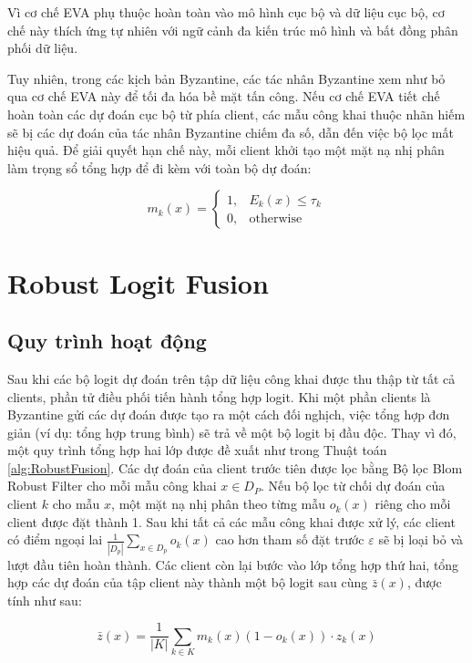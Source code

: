 Vì cơ chế EVA phụ thuộc hoàn toàn vào mô hình cục bộ và dữ liệu cục bộ, cơ chế này thích ứng tự nhiên với ngữ cảnh đa kiến trúc mô hình và bất đồng phân phối dữ liệu.

Tuy nhiên, trong các kịch bản Byzantine, các tác nhân Byzantine xem như bỏ qua cơ chế EVA này để tối đa hóa bề mặt tấn công. Nếu cơ chế EVA tiết chế hoàn toàn các dự đoán cục bộ từ phía client, các mẫu công khai thuộc nhãn hiếm sẽ bị các dự đoán của tác nhân Byzantine chiếm đa số, dẫn đến việc bộ lọc mất hiệu quả. Để giải quyết hạn chế này, mỗi client khởi tạo một mặt nạ nhị phân làm trọng sổ tổng hợp để đi kèm với toàn bộ dự đoán:

\begin{equation}
\label{energymask}
m_k(x) =
\begin{cases}
1,  &E_k(x) \leq \tau_k \\
0, &\text{otherwise}
\end{cases}
\end{equation}

\section{Robust Logit Fusion}
\label{sec:blom}

\subsection{Quy trình hoạt động}
Sau khi các bộ logit dự đoán trên tập dữ liệu công khai được thu thập từ tất cả clients, phần tử điều phối tiến hành tổng hợp logit. Khi một phần clients là Byzantine gửi các dự đoán được tạo ra một cách đối nghịch, việc tổng hợp đơn giản (ví dụ: tổng hợp trung bình) sẽ trả về một bộ logit bị đầu độc. Thay vì đó, một quy trình tổng hợp hai lớp được đề xuất như trong Thuật toán \ref{alg:RobustFusion}. Các dự đoán của client trước tiên được lọc bằng Bộ lọc Blom Robust Filter cho mỗi mẫu công khai $x \in D_P$. Nếu bộ lọc từ chối dự đoán của client $k$ cho mẫu $x$, một mặt nạ nhị phân theo từng mẫu $o_k(x)$ riêng cho mỗi client được đặt thành 1. Sau khi tất cả các mẫu công khai được xử lý, các client có điểm ngoại lai $\frac{1}{|D_p|}\sum_{x \in D_p}o_k(x)$ cao hơn tham số đặt trước $\varepsilon$ sẽ bị loại bỏ và lượt đầu tiên hoàn thành. Các client còn lại bước vào lớp tổng hợp thứ hai, tổng hợp các dự đoán của tập client này thành một bộ logit sau cùng $\bar z(x)$, được tính như sau:

\begin{equation}
\label{FinalFusion}
\bar z(x)=\frac{1}{|K|}\sum_{k \in K}m_k(x) (1-o_k(x))\cdot z_k(x)
\end{equation}

